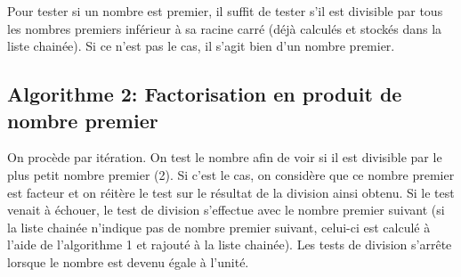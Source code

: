 \documentclass[11pt,a4paper]{article}
\begin{document}
Pour tester si un nombre est premier, il suffit de tester s'il est divisible par tous les nombres premiers inférieur à sa racine carré (déjà calculés et stockés dans la liste chainée). Si ce n'est pas le cas, il s'agit bien d'un nombre premier. 
 
 
 \subsection*{Algorithme 2: Factorisation en produit de nombre premier}   
 
 On procède par itération. On test le nombre afin de voir si il est divisible par le plus petit nombre premier (2). Si c'est le cas, on considère que ce nombre premier est facteur et on réitère le test sur le résultat de la division ainsi obtenu. Si le test venait à échouer, le test de division s'effectue avec le nombre premier suivant (si la liste chainée n'indique pas de nombre premier suivant, celui-ci est calculé à l'aide de l'algorithme 1 et rajouté à la liste chainée). Les tests de division s'arrête lorsque le nombre est devenu égale à l'unité.
\end{document}
